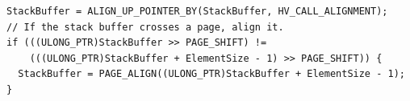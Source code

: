 \begin{verbatim}
StackBuffer = ALIGN_UP_POINTER_BY(StackBuffer, HV_CALL_ALIGNMENT);
// If the stack buffer crosses a page, align it.
if (((ULONG_PTR)StackBuffer >> PAGE_SHIFT) !=
    (((ULONG_PTR)StackBuffer + ElementSize - 1) >> PAGE_SHIFT)) {
  StackBuffer = PAGE_ALIGN((ULONG_PTR)StackBuffer + ElementSize - 1);
}
\end{verbatim}

\fi


